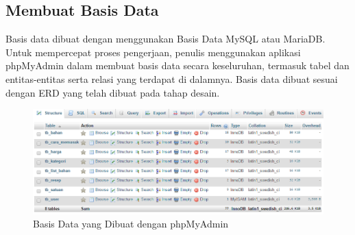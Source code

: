 	\subsection{Membuat Basis Data}
		Basis data dibuat dengan menggunakan Basis Data MySQL atau MariaDB. Untuk mempercepat proses pengerjaan, penulis menggunakan aplikasi phpMyAdmin dalam membuat basis data secara keseluruhan, termasuk tabel dan entitas-entitas serta relasi yang terdapat di dalamnya. Basis data dibuat sesuai dengan ERD yang telah dibuat pada tahap desain.
		\begin{figure}[H]
			\centering
			\includegraphics[width=1\textwidth]{gambar/phpmyadmin_masakyuk}
			\caption{Basis Data yang Dibuat dengan phpMyAdmin}
			\label{phpmyadmin}
		\end{figure}
	

